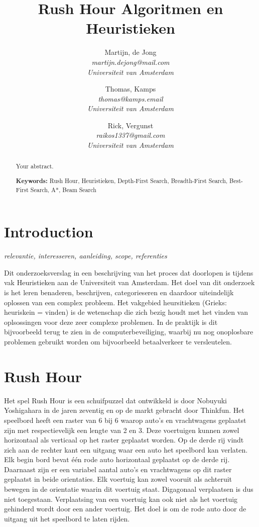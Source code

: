\documentclass[a4paper]{article}
\title{Rush Hour Algoritmen en Heuristieken}
\author{
  Martijn, de Jong\\
  \textit{martijn.dejong@mail.com}\\
  \textit{Universiteit van Amsterdam}
  \and
  Thomas, Kamps\\
  \textit{thomas@kamps.email}\\
  \textit{Universiteit van Amsterdam}
  \and
  Rick, Vergunst\\
  \textit{raikos1337@gmail.com}\\
  \textit{Universiteit van Amsterdam}
}
\begin{document}
\maketitle

\begin{abstract}
Your abstract.

\vspace{5mm}
\textbf{Keywords:} Rush Hour, Heuristieken, Depth-First Search, Breadth-First Search, Best-First Search, A*, Beam Search
\end{abstract}

\section{Introduction}
\textit{relevantie, interesseren, aanleiding, scope, referenties}

Dit onderzoeksverslag in een beschrijving van het proces dat doorlopen is tijdens vak Heuristieken aan de Universiteit van Amsterdam. Het doel van dit onderzoek is het leren benaderen, beschrijven, categorieseren en daardoor uiteindelijk oplossen van een complex probleem. Het vakgebied heursitieken (Grieks: heuriskein = vinden) is de wetenschap die zich bezig houdt met het vinden van oplsossingen voor deze zeer complexe problemen. In de praktijk is dit bijvoorbeeld terug te zien in de computerbeveiliging, waarbij nu nog onoplosbare problemen gebruikt worden om bijvoorbeeld betaalverkeer te versleutelen.

\section{Rush Hour}
Het spel Rush Hour is een schuifpuzzel dat ontwikkeld is door Nobuyuki Yoshigahara in de jaren zeventig en op de markt gebracht door Thinkfun. Het speelbord heeft een raster van 6 bij 6 waarop auto's en vrachtwagens geplaatst zijn met respectievelijk een lengte van 2 en 3. Deze voertuigen kunnen zowel horizontaal als verticaal op het raster geplaatst worden. Op de derde rij vindt zich aan de rechter kant een uitgang waar een auto het speelbord kan verlaten. Elk begin bord bevat één rode auto horizontaal geplaatst op de derde rij. Daarnaast zijn er een variabel aantal auto's en vrachtwagens op dit raster geplaatst in beide orientaties. Elk voertuig kan zowel vooruit als achteruit bewegen in de orientatie waarin dit voertuig staat. Digagonaal verplaatsen is dus niet toegestaan. Verplaatsing van een voertuig kan ook niet als het voertuig gehinderd wordt door een ander voertuig. Het doel is om de rode auto door de uitgang uit het speelbord te laten rijden. 
\end{document}
